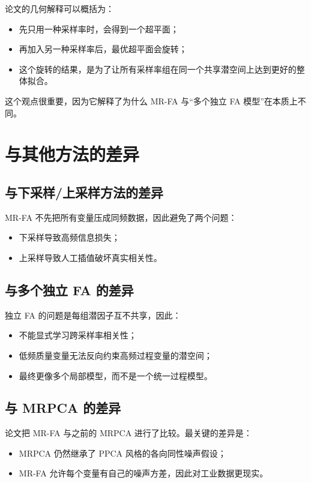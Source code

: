 \documentclass[UTF8]{ctexart}
\begin{document}
论文的几何解释可以概括为：
\begin{itemize}
    \item 先只用一种采样率时，会得到一个超平面；
    \item 再加入另一种采样率后，最优超平面会旋转；
    \item 这个旋转的结果，是为了让所有采样率组在同一个共享潜空间上达到更好的整体拟合。
\end{itemize}

这个观点很重要，因为它解释了为什么 MR-FA 与“多个独立 FA 模型”在本质上不同。

\section{与其他方法的差异}

\subsection{与下采样/上采样方法的差异}

MR-FA 不先把所有变量压成同频数据，因此避免了两个问题：
\begin{itemize}
    \item 下采样导致高频信息损失；
    \item 上采样导致人工插值破坏真实相关性。
\end{itemize}

\subsection{与多个独立 FA 的差异}

独立 FA 的问题是每组潜因子互不共享，因此：
\begin{itemize}
    \item 不能显式学习跨采样率相关性；
    \item 低频质量变量无法反向约束高频过程变量的潜空间；
    \item 最终更像多个局部模型，而不是一个统一过程模型。
\end{itemize}

\subsection{与 MRPCA 的差异}

论文把 MR-FA 与之前的 MRPCA 进行了比较。最关键的差异是：
\begin{itemize}
    \item MRPCA 仍然继承了 PPCA 风格的各向同性噪声假设；
    \item MR-FA 允许每个变量有自己的噪声方差，因此对工业数据更现实。
\end{itemize}
\end{document}
